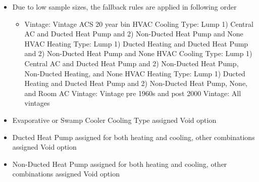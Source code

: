 \begin{itemize}
\item Due to low sample sizes, the fallback rules are applied in following order
  \begin{itemize}
  \item Vintage: Vintage ACS 20 year bin HVAC Cooling Type: Lump 1) Central AC and Ducted Heat Pump and 2) Non-Ducted Heat Pump and None HVAC Heating Type: Lump 1) Ducted Heating and Ducted Heat Pump and 2) Non-Ducted Heat Pump and None HVAC Cooling Type: Lump 1) Central AC and Ducted Heat Pump and 2) Non-Ducted Heat Pump, Non-Ducted Heating, and None HVAC Heating Type: Lump 1) Ducted Heating and Ducted Heat Pump and 2) Non-Ducted Heat Pump, None, and Room AC Vintage: Vintage pre 1960s and post 2000 Vintage: All vintages
  \end{itemize}
\item Evaporative or Swamp Cooler Cooling Type assigned Void option
\item Ducted Heat Pump assigned for both heating and cooling, other combinations assigned Void option
\item Non-Ducted Heat Pump assigned for both heating and cooling, other combinations assigned Void option
\end{itemize}
